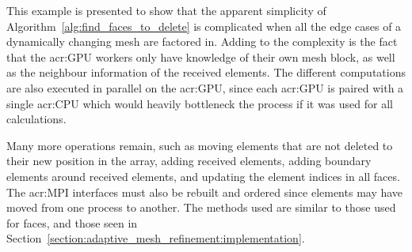 This example is presented to show that the apparent simplicity of
Algorithm~\ref{alg:find_faces_to_delete} is complicated when all the edge cases of a dynamically
changing mesh are factored in. Adding to the complexity is the fact that the \acrshort{acr:GPU}
workers only have knowledge of their own mesh block, as well as the neighbour information of the
received elements. The different computations are also executed in parallel on the
\acrshort{acr:GPU}, since each \acrshort{acr:GPU} is paired with a single \acrshort{acr:CPU} which
would heavily bottleneck the process if it was used for all calculations.

Many more operations remain, such as moving elements that are not deleted to their new position in
the array, adding received elements, adding boundary elements around received elements, and updating
the element indices in all faces. The \acrshort{acr:MPI} interfaces must also be rebuilt and ordered
since elements may have moved from one process to another. The methods used are similar to those
used for faces, and those seen in Section~\ref{section:adaptive_mesh_refinement:implementation}. 

